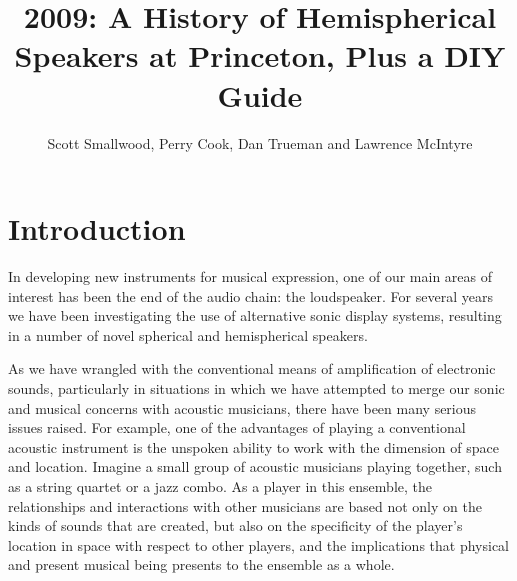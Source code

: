 
\graphicspath{ {mainmatter/Smallwood_2009/} }

\title*{2009: A History of Hemispherical Speakers at Princeton, Plus a DIY Guide}


\author{Scott Smallwood, Perry Cook, Dan Trueman and Lawrence McIntyre}


%
%
\maketitle


\section{Introduction}

In developing new instruments for musical expression, one of our main areas of
interest has been the end of the audio chain:  the loudspeaker. For several years
we have been investigating the use of alternative sonic display systems,
resulting in a number of novel spherical and hemispherical speakers.

As we have wrangled with the conventional means of amplification of electronic
sounds, particularly in situations in which we have attempted to merge our sonic
and musical concerns with acoustic musicians, there have been many serious issues
raised.  For example, one of the advantages of playing a conventional acoustic
instrument is the unspoken ability to work with the dimension of space and
location.  Imagine a small group of acoustic musicians playing together, such as
a string quartet or a jazz combo. As a player in this ensemble, the relationships
and interactions with other musicians are based not only on the kinds of sounds
that are created, but also on the specificity of the player's location in space
with respect to other players, and the implications that physical and present
musical being presents to the ensemble as a whole.

